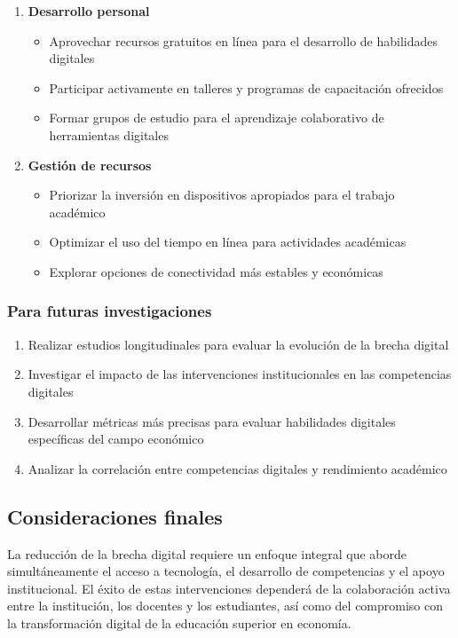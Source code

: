 \documentclass[12pt, a4paper]{article}
\begin{document}
\begin{enumerate}
    \item \textbf{Desarrollo personal}
    \begin{itemize}
        \item Aprovechar recursos gratuitos en línea para el desarrollo de habilidades digitales
        \item Participar activamente en talleres y programas de capacitación ofrecidos
        \item Formar grupos de estudio para el aprendizaje colaborativo de herramientas digitales
    \end{itemize}

    \item \textbf{Gestión de recursos}
    \begin{itemize}
        \item Priorizar la inversión en dispositivos apropiados para el trabajo académico
        \item Optimizar el uso del tiempo en línea para actividades académicas
        \item Explorar opciones de conectividad más estables y económicas
    \end{itemize}
\end{enumerate}

\subsubsection{Para futuras investigaciones}

\begin{enumerate}
    \item Realizar estudios longitudinales para evaluar la evolución de la brecha digital
    \item Investigar el impacto de las intervenciones institucionales en las competencias digitales
    \item Desarrollar métricas más precisas para evaluar habilidades digitales específicas del campo económico
    \item Analizar la correlación entre competencias digitales y rendimiento académico
\end{enumerate}

\subsection{Consideraciones finales}

La reducción de la brecha digital requiere un enfoque integral que aborde simultáneamente el acceso a tecnología, el desarrollo de competencias y el apoyo institucional. El éxito de estas intervenciones dependerá de la colaboración activa entre la institución, los docentes y los estudiantes, así como del compromiso con la transformación digital de la educación superior en economía.
\end{document}
